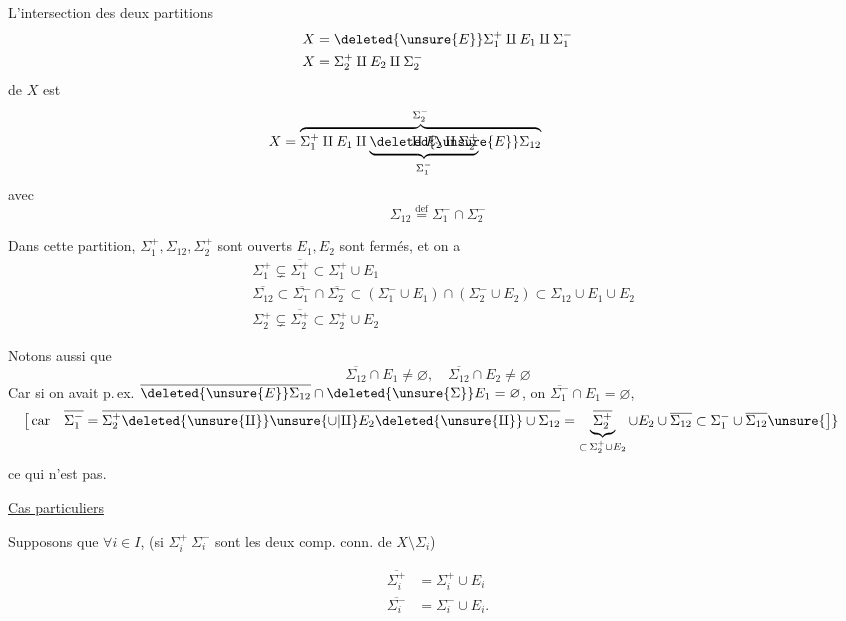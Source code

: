 L'intersection des deux partitions
\[
 \begin{aligned}
 X&=\deleted{\unsure{E}}\Sigma_1^+\amalg E_1\amalg\Sigma_1^-\\
 X&=\Sigma_2^+\amalg E_2\amalg\Sigma_2^-
 \end{aligned}
\]
de $X$ est
\[
 X=\overbrace{\Sigma_1^+\amalg E_1\amalg
 \rlap{$\displaystyle\underbrace{\phantom{E^{?}\Sigma_{12}}\amalg
 E_2\amalg\Sigma_2^+}_{\Sigma_1^-}$}\deleted{\unsure{E}}\Sigma_{12}}^{\Sigma_2^-}
 \phantom{\amalg E_2\amalg\Sigma_2^+}
\]
avec
\[
 \Sigma_{12}\overset{\text{def}}{=}\Sigma_1^-\cap\Sigma_2^-
\]

Dans cette partition, $\Sigma_1^+,\Sigma_{12},\Sigma_2^+$ sont ouverts $E_1,E_2$ sont fermés, et on a
\[
 \begin{aligned}
 &\Sigma_1^+\subsetneq\overline{\Sigma_1^+}\subset\Sigma_1^+\cup E_1\\
 &\overline{\Sigma_{12}}\subset\overline{\Sigma_1^-}\cap\overline{\Sigma_2^-}\subset
 (\Sigma_1^-\cup E_1)\cap(\Sigma_2^-\cup E_2)\subset\Sigma_{12}\cup E_1\cup E_2\\
 &\Sigma_2^+\subsetneq\overline{\Sigma_2^+}\subset\Sigma_2^+\cup E_2
 \end{aligned}
\]

Notons aussi que
\[
 \overline{\Sigma_{12}}\cap E_1\ne\varnothing,\quad
 \overline{\Sigma_{12}}\cap E_2\ne\varnothing
\]
Car si on avait p.\,ex. $\overline{\deleted{\unsure{E}}\Sigma_{12}}\cap
\deleted{\unsure{\Sigma}}E_1=\varnothing$, on 
 $\overline{\Sigma_1^-}\cap E_1=\varnothing$,
\[
 \begin{aligned}
 \big[\,\text{car}\quad\overline{\Sigma_1^-}&=
 \overline{\Sigma_2^+\deleted{\unsure{\amalg}}\unsure{\cup|\amalg} E_2
 \deleted{\unsure{\amalg}}\cup\Sigma_{12}}=
 \underbrace{\overline{\Sigma_2^+}}_{\subset\,\Sigma_2^+\cup E_2}\cup E_2
 \cup\overline{\Sigma_{12}}\subset\Sigma_1^-\cup\overline{\Sigma_{12}}\unsure{\big]}
 \end{aligned}
\]
ce qui n'est pas.

\uline{Cas particuliers}

Supposons que $\forall i\in I$,   (si $\Sigma_i^+\ \Sigma_i^-$ sont les deux comp. conn. de $X\setminus\Sigma_i$)

\[
\begin{aligned}
\overline{\Sigma_i^+} &= \Sigma_i^+\cup E_i\\
\overline{\Sigma_i^-} &= \Sigma_i^-\cup E_i .
\end{aligned}
\]

